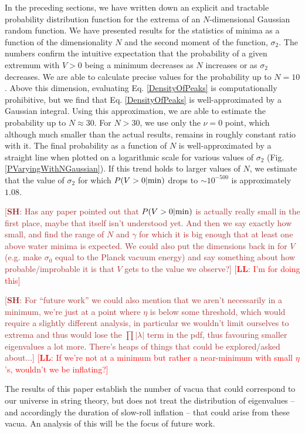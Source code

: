 \documentclass[12pt]{article}
\newcommand{\lfl}[1]{\textcolor{red}{[{\bf LL}: #1]}}
\newcommand{\SH}[1]{\textcolor{brown}{[{\bf SH}: #1]}}
\begin{document}
In the preceding sections, we have  written down an explicit and tractable probability distribution function for the extrema of an $N$-dimensional  Gaussian random function. We have presented results for the statistics of minima as a function of the dimensionality $N$ and the second moment of the function, $\sigma_2$.  The numbers confirm the intuitive expectation that the probability of a given extremum with $V > 0$ being a minimum decreases as $N$ increases or as $\sigma_2$ decreases. We are able to calculate precise values for the probability up to $N=10$. Above this dimension, evaluating Eq. \ref{DensityOfPeaks} is computationally prohibitive, but we find that Eq. \ref{DensityOfPeaks} is well-approximated by a Gaussian integral. Using this approximation, we are able to estimate the probability up to $N \approx 30$. For $N>30$, we use only the $\nu=0$ point, which although much smaller than the actual results, remains in roughly constant ratio with it. The final probability as a function of $N$ is well-approximated by a straight line when plotted on a logarithmic scale for various values of $\sigma_2$ (Fig. \ref{PVaryingWithNGaussian}). If this trend holds to larger values of $N$, we estimate that the value of $\sigma_2$ for which $P(V>0|{\rm min})$ drops to $\sim 10^{-500}$ is approximately $1.08$.

\SH{Has any paper pointed out that $P(V>0|{\rm min})$ is actually really small in the first place, maybe that itself isn't understood yet. And then we say exactly how small, and find the range of $N$ and $\gamma$ for which it is big enough that at least one above water minima is expected. We could also put the dimensions back in for $V$ (e.g. make $\sigma_0$ equal to the Planck vacuum energy)  and say something about how probable/improbable it is that $V$ gets to the value we observe?} \lfl{I'm for doing this}

\SH{For ``future work'' we could also mention that we aren't necessarily in a minimum, we're just at a point where $\eta$ is below some threshold, which would require a slightly different analysis, in particular we wouldn't limit ourselves to extrema and thus would lose the $\prod |\lambda|$ term in the pdf, thus favouring smaller eigenvalues a lot more. There's heaps of things that could be explored/asked about...} \lfl{If we're not at a minimum but rather a near-minimum with small $\eta$'s, wouldn't we be inflating?}




The results of this paper establish the number of vacua that could correspond to our universe in string theory, but does not treat the distribution of eigenvalues -- and accordingly the duration of slow-roll inflation -- that could arise from these vacua. An analysis of this will be the focus of future work.
\end{document}
